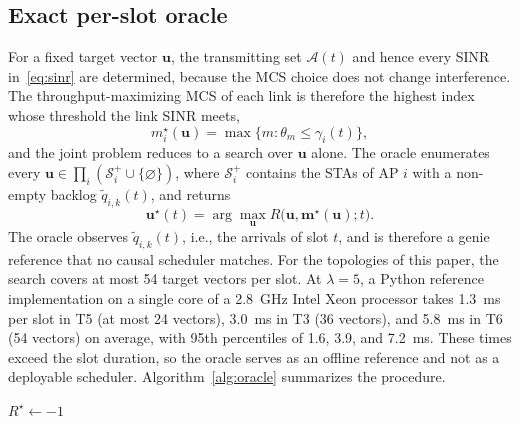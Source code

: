 \documentclass{ieeeaccess}
\begin{document}
\subsection{Exact per-slot oracle}
For a fixed target vector $\mathbf{u}$, the transmitting set $\mathcal{A}(t)$ and hence every SINR in~\eqref{eq:sinr} are determined, because the MCS choice does not change interference. The throughput-maximizing MCS of each link is therefore the highest index whose threshold the link SINR meets,
\begin{equation}
m_i^{\star}(\mathbf{u}) = \max\{ m : \theta_m \le \gamma_i(t) \},
\label{eq:best_mcs}
\end{equation}
and the joint problem reduces to a search over $\mathbf{u}$ alone. The oracle enumerates every $\mathbf{u} \in \prod_{i} (\mathcal{S}_i^{+} \cup \{\varnothing\})$, where $\mathcal{S}_i^{+}$ contains the STAs of AP $i$ with a non-empty backlog $\tilde{q}_{i,k}(t)$, and returns
\begin{equation}
\mathbf{u}^{\star}(t) = \arg\max_{\mathbf{u}} R\bigl(\mathbf{u}, \mathbf{m}^{\star}(\mathbf{u}); t\bigr).
\label{eq:oracle}
\end{equation}
The oracle observes $\tilde{q}_{i,k}(t)$, i.e., the arrivals of slot $t$, and is therefore a genie reference that no causal scheduler matches. For the topologies of this paper, the search covers at most 54 target vectors per slot. At $\lambda = 5$, a Python reference implementation on a single core of a 2.8~GHz Intel Xeon processor takes 1.3~ms per slot in T5 (at most 24 vectors), 3.0~ms in T3 (36 vectors), and 5.8~ms in T6 (54 vectors) on average, with 95th percentiles of 1.6, 3.9, and 7.2~ms. These times exceed the slot duration, so the oracle serves as an offline reference and not as a deployable scheduler. Algorithm~\ref{alg:oracle} summarizes the procedure.

\begin{algorithm}
\caption{Exact per-slot oracle}
\label{alg:oracle}
$R^{\star} \leftarrow -1$\;
\;
\end{algorithm}
\end{document}
